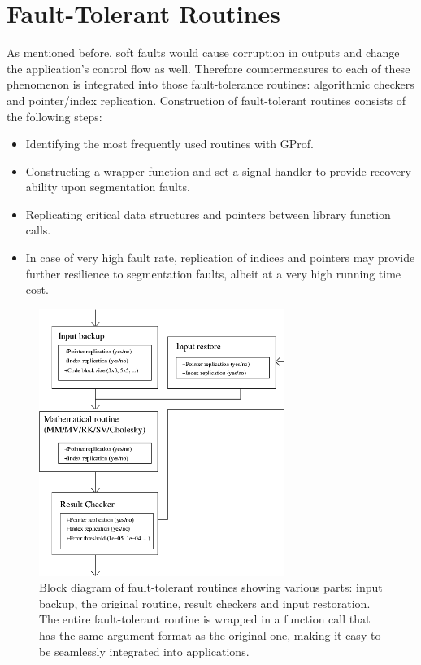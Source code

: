 \documentclass{article}
\begin{document}
\section{Fault-Tolerant Routines}

As mentioned before, soft faults would cause corruption in outputs and change the application's control flow as well. Therefore countermeasures to each of these phenomenon is integrated into those fault-tolerance routines: algorithmic checkers and pointer/index replication. Construction of fault-tolerant routines consists of the following steps:

\begin{itemize}
\item{Identifying the most frequently used routines with GProf.}
\item{Constructing a wrapper function and set a signal handler to provide recovery ability upon segmentation faults.}
\item{Replicating critical data structures and pointers between library function calls.}
\item{In case of very high fault rate, replication of indices and pointers may provide further resilience to segmentation faults, albeit at a very high running time cost.}
\end{itemize}


\begin{figure}
\includegraphics[width=8cm,natwidth=560,natheight=507]{flow.png}
\caption{Block diagram of fault-tolerant routines showing various parts: input backup, the original routine, result checkers and input restoration. The entire fault-tolerant routine is wrapped in a function call that has the same argument format as the original one, making it easy to be seamlessly integrated into applications.}
\label{faultRoutinesBlockDiagram}
\end{figure}
\end{document}

